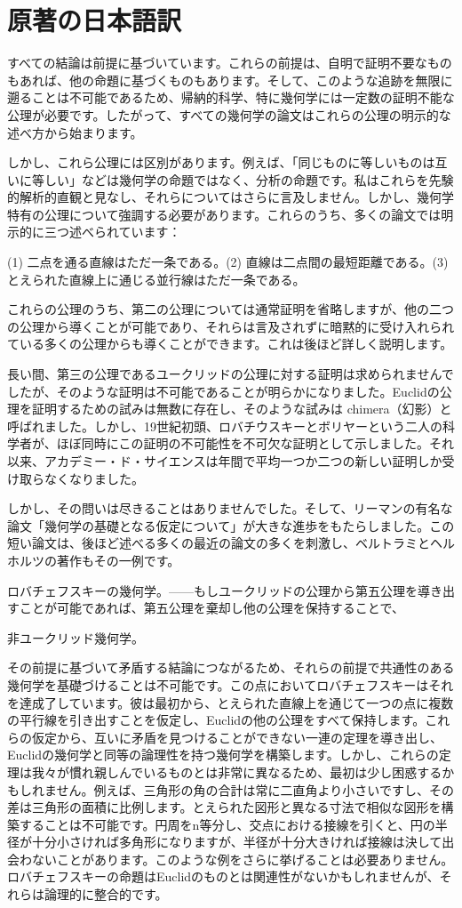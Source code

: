 \documentclass[a4paper,11pt,openany]{ltjsbook}
\begin{document}
\section{原著の日本語訳}
すべての結論は前提に基づいています。これらの前提は、自明で証明不要なものもあれば、他の命題に基づくものもあります。そして、このような追跡を無限に遡ることは不可能であるため、帰納的科学、特に幾何学には一定数の証明不能な公理が必要です。したがって、すべての幾何学の論文はこれらの公理の明示的な述べ方から始まります。

しかし、これら公理には区別があります。例えば、「同じものに等しいものは互いに等しい」などは幾何学の命題ではなく、分析の命題です。私はこれらを先験的解析的直観と見なし、それらについてはさらに言及しません。しかし、幾何学特有の公理について強調する必要があります。これらのうち、多くの論文では明示的に三つ述べられています：

(1) 二点を通る直線はただ一条である。(2) 直線は二点間の最短距離である。(3) とえられた直線上に通じる並行線はただ一条である。

これらの公理のうち、第二の公理については通常証明を省略しますが、他の二つの公理から導くことが可能であり、それらは言及されずに暗黙的に受け入れられている多くの公理からも導くことができます。これは後ほど詳しく説明します。

長い間、第三の公理であるユークリッドの公理に対する証明は求められませんでしたが、そのような証明は不可能であることが明らかになりました。Euclidの公理を証明するための試みは無数に存在し、そのような試みは chimera（幻影）と呼ばれました。しかし、19世紀初頭、ロバチウスキーとボリヤーという二人の科学者が、ほぼ同時にこの証明の不可能性を不可欠な証明として示しました。それ以来、アカデミー・ド・サイエンスは年間で平均一つか二つの新しい証明しか受け取らなくなりました。

しかし、その問いは尽きることはありませんでした。そして、リーマンの有名な論文「幾何学の基礎となる仮定について」が大きな進歩をもたらしました。この短い論文は、後ほど述べる多くの最近の論文の多くを刺激し、ベルトラミとヘルホルツの著作もその一例です。

ロバチェフスキーの幾何学。——もしユークリッドの公理から第五公理を導き出すことが可能であれば、第五公理を棄却し他の公理を保持することで、

非ユークリッド幾何学。


その前提に基づいて矛盾する結論につながるため、それらの前提で共通性のある幾何学を基礎づけることは不可能です。この点においてロバチェフスキーはそれを達成了しています。彼は最初から、とえられた直線上を通じて一つの点に複数の平行線を引き出すことを仮定し、Euclidの他の公理をすべて保持します。これらの仮定から、互いに矛盾を見つけることができない一連の定理を導き出し、Euclidの幾何学と同等の論理性を持つ幾何学を構築します。しかし、これらの定理は我々が慣れ親しんでいるものとは非常に異なるため、最初は少し困惑するかもしれません。例えば、三角形の角の合計は常に二直角より小さいですし、その差は三角形の面積に比例します。とえられた図形と異なる寸法で相似な図形を構築することは不可能です。円周をn等分し、交点における接線を引くと、円の半径が十分小さければ多角形になりますが、半径が十分大きければ接線は決して出会わないことがあります。このような例をさらに挙げることは必要ありません。ロバチェフスキーの命題はEuclidのものとは関連性がないかもしれませんが、それらは論理的に整合的です。
\end{document}

